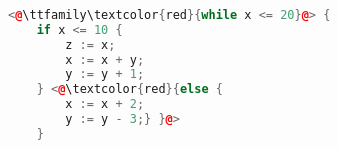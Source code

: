 \begin{lstlisting}[language=C++,basicstyle=\ttfamily,keywordstyle=\color{blue}]  % Start your code-block
	
<@\ttfamily\textcolor{red}{while x <= 20}@> {
	if x <= 10 {
		z := x;
		x := x + y;
		y := y + 1;
	} <@\textcolor{red}{else {
		x := x + 2;
		y := y - 3;} }@>
	}
\end{lstlisting}
